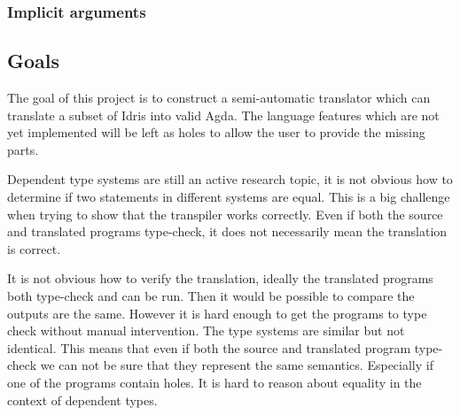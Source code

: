 \documentclass[parskip=half]{scrartcl}
\begin{document}
\subsubsection{Implicit arguments}


\subsection{Goals}
The goal of this project is to construct a semi-automatic translator which can
translate a subset of Idris into valid Agda. The language features which are
not yet implemented will be left as holes to allow the user to provide the
missing parts.



Dependent type systems are still an active research topic, it is not obvious
how to determine if two statements in different systems are equal. This is
a big challenge when trying to show that the transpiler works correctly.  Even
if both the source and translated programs type-check, it does not necessarily
mean the translation is correct.

It is not obvious how to verify the translation, ideally the translated
programs both type-check and can be run. Then it would be possible to compare
the outputs are the same. However it is hard enough to get the programs to type
check without manual intervention. The type systems are similar but not
identical. This means that even if both the source and translated program
type-check we can not be sure that they represent the same semantics.
Especially if one of the programs contain holes. It is hard to reason about
equality in the context of dependent types.
\end{document}
